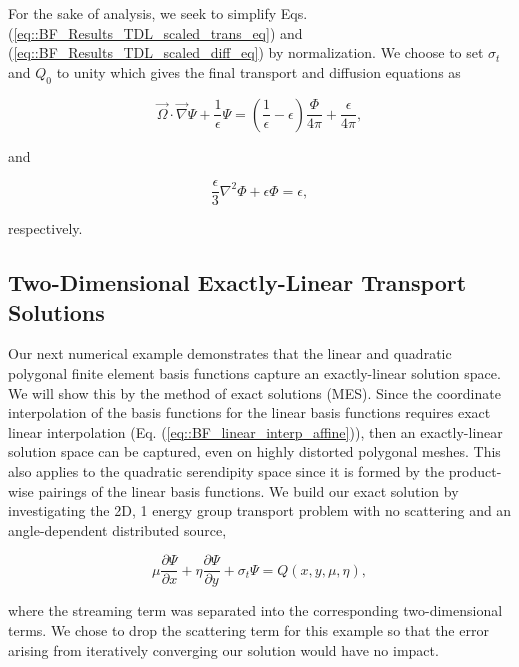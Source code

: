 For the sake of analysis, we seek to simplify Eqs. (\ref{eq::BF_Results_TDL_scaled_trans_eq}) and (\ref{eq::BF_Results_TDL_scaled_diff_eq}) by normalization. We choose to set $\sigma_t$ and $Q_0$ to unity which gives the final transport and diffusion equations as  

\begin{equation}
\label{eq::BF_Results_TDL_normalized_trans_eq}
\vec{\Omega} \cdot \vec{\nabla} \Psi + \frac{1}{\epsilon} \Psi =  \left( \frac{1}{\epsilon} - \epsilon   \right)  \frac{\Phi}{4 \pi} +  \frac{\epsilon}{4 \pi} ,
\end{equation}

\noindent and

\begin{equation}
\label{eq::BF_Results_TDL_normalized_diff_eq}
\frac{\epsilon}{3} {\nabla}^2 \Phi + \epsilon  \Phi =  \epsilon ,
\end{equation}

\noindent respectively.

\subsection{Two-Dimensional Exactly-Linear Transport Solutions}
\label{sec::BF_Results_Linear}

Our next numerical example demonstrates that the linear and quadratic polygonal finite element basis functions capture an exactly-linear solution space. We will show this by the method of exact solutions (MES). Since the coordinate interpolation of the basis functions for the linear basis functions requires exact linear interpolation (Eq. (\ref{eq::BF_linear_interp_affine})), then an exactly-linear solution space can be captured, even on highly distorted polygonal meshes. This also applies to the quadratic serendipity space since it is formed by the product-wise pairings of the linear basis functions. We build our exact solution by investigating the 2D, 1 energy group transport problem with no scattering and an angle-dependent distributed source,

\begin{equation}
\label{eq::BF_Results_Linear_angflux}
\mu \frac{\partial \Psi}{\partial x} + \eta \frac{\partial \Psi}{\partial y} + \sigma_t \Psi = Q(x,y, \mu, \eta), 
\end{equation}

\noindent where the streaming term was separated into the corresponding two-dimensional terms. We chose to drop the scattering term for this example so that the error arising from iteratively converging our solution would have no impact.

